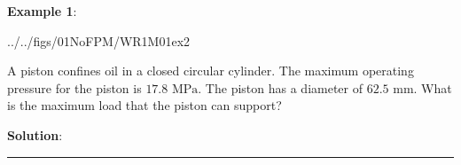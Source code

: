 \documentclass[10pt]{amsart}
\begin{document}
\begin{minipage}[t]{0.45\textwidth}
 \raggedright
 \textbf{Example 1}:
 \begin{cfig}[0.5]{../../figs/01NoFPM/WR1M01ex2}\end{cfig}
 A piston confines oil in a closed circular cylinder. The maximum operating pressure for the
 piston is $17.8\text{ MPa}$. The piston has a diameter of $62.5\text{ mm}$. What is the maximum
 load that the piston can support?
\end{minipage}
\hfill
\begin{minipage}[t]{0.5\textwidth}
 \textbf{Solution}:
\end{minipage}
\par
\vspace{6cm}
\rule{\textwidth}{0.02in}
\parb
\end{document}
